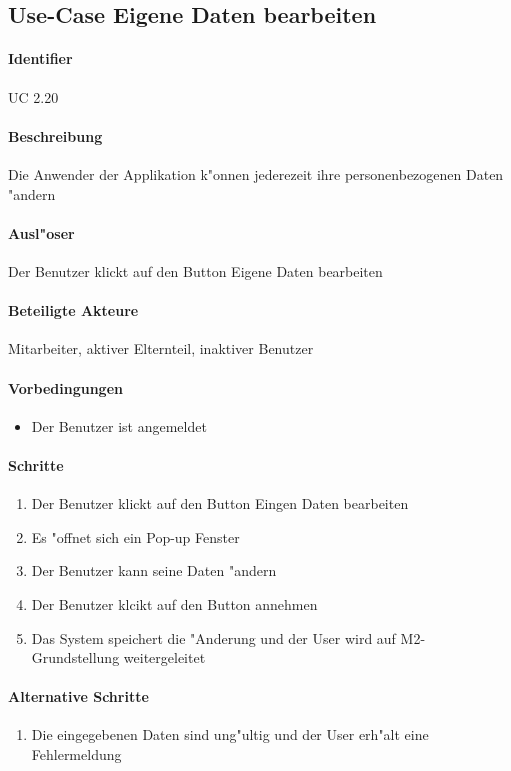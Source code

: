   
    \newpage
 \subsection{Use-Case Eigene Daten bearbeiten}
  \paragraph{Identifier}
  UC 2.20
  \paragraph{Beschreibung}
  Die Anwender der Applikation k"onnen jederezeit ihre personenbezogenen Daten "andern
  \paragraph{Ausl"oser}
  Der Benutzer klickt auf den Button \dq Eigene Daten bearbeiten\dq
  \paragraph{Beteiligte Akteure}   \leavevmode \newline
    Mitarbeiter, aktiver Elternteil, inaktiver Benutzer
  \paragraph{Vorbedingungen}
  \begin{itemize}
   \item Der Benutzer ist angemeldet
  \end{itemize}

  \paragraph{Schritte}
  \begin{enumerate}
   \item Der Benutzer klickt auf den Button \dq Eingen Daten bearbeiten\dq
   \item Es "offnet sich ein Pop-up Fenster
   \item Der Benutzer kann seine Daten "andern
   \item Der Benutzer klcikt auf den Button \dq annehmen\dq
   \item Das System speichert die "Anderung und der User wird auf M2-Grundstellung weitergeleitet
  \end{enumerate}

  \paragraph{Alternative Schritte}
  \begin{enumerate}
   \item Die eingegebenen Daten sind ung"ultig und der User erh"alt eine Fehlermeldung
  \end{enumerate}

